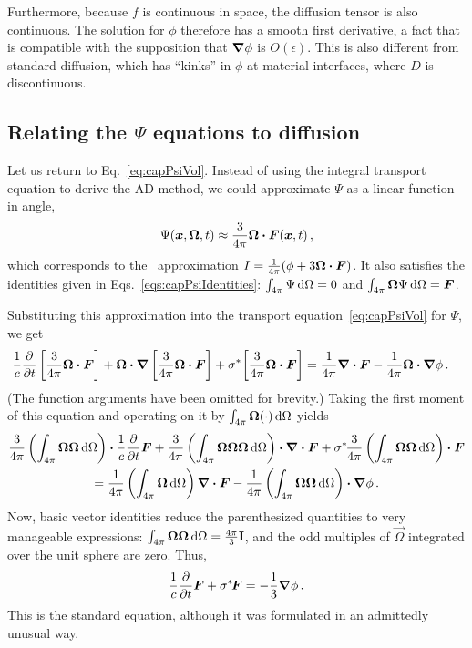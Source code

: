 Furthermore, because $f$ is continuous in space, the diffusion tensor is also
continuous. The solution for $\phi$ therefore has a smooth first
derivative, a fact that is compatible with the supposition that $\bm{\nabla} \phi$
is $O(\epsilon)$. This is also different from standard diffusion, which has
``kinks'' in $\phi$ at material interfaces, where $D$ is discontinuous.

\subsection{Relating the \texorpdfstring{$\Psi$}{Psi} equations to
diffusion}\label{sec:adDiscDiff}
Let us return to Eq.~\eqref{eq:capPsiVol}. Instead of using the integral
transport equation to derive the AD method, we could approximate $\Psi$
as a linear function in angle,
\begin{equation*}
  \Psi(\bm{x}, \bm{\Omega}, t) \approx \frac{3}{4\pi} \bm{\Omega} \bm{\cdot}
  \bm{F}(\bm{x}, t)\,,
\end{equation*}
which corresponds to the \Pone\ approximation $I= \frac{1}{4\pi} (\phi +
3\bm{\Omega} \bm{\cdot} \bm{F})$. It also satisfies the identities given in
Eqs.~\eqref{eqs:capPsiIdentities}: $\int_{4\pi} \Psi \mathop{}\!\mathrm{d}\Omega = 0$ and
$\int_{4\pi} \bm{\Omega} \Psi \mathop{}\!\mathrm{d}\Omega = \bm{F}$.

Substituting this approximation into the transport equation~\eqref{eq:capPsiVol}
for $\Psi$, we get
\begin{align*}
  \frac{1}{c} \frac{\partial }{\partial t} \left[ \frac{3}{4\pi} \bm{\Omega} \bm{\cdot} \bm{F} \right]
  + \bm{\Omega}\bm{\cdot} \bm{\nabla} \left[ \frac{3}{4\pi} \bm{\Omega} \bm{\cdot} \bm{F} \right]
  + \sigma^{*\!} \left[ \frac{3}{4\pi} \bm{\Omega} \bm{\cdot} \bm{F} \right]
  &= \frac{1}{4\pi} \bm{\nabla} \bm{\cdot}\bm{F}
  - \frac{1}{4\pi} \bm{\Omega}\bm{\cdot} \bm{\nabla} \phi\,.
\end{align*}
(The function arguments have been omitted for brevity.)
Taking the first moment of this equation and operating on it by $\int_{4\pi}
\bm{\Omega}(\cdot) \mathop{}\!\mathrm{d}\Omega$ yields
\begin{multline*}
\frac{3}{4\pi} \left( \int_{4\pi} \bm{\Omega}\bm{\Omega}\mathop{}\!\mathrm{d}\Omega \right) \bm{\cdot}
\frac{1}{c} \frac{\partial }{\partial t} \bm{F}
+ \frac{3}{4\pi} \left( \int_{4\pi}
  \bm{\Omega}\bm{\Omega}\bm{\Omega}\mathop{}\!\mathrm{d}\Omega \right)
\bm{\cdot} \bm{\nabla} \bm{\cdot} \bm{F}
+ \sigma^{*\!} \frac{3}{4\pi} \left( \int_{4\pi}
\bm{\Omega}\bm{\Omega}\mathop{}\!\mathrm{d}\Omega \right) \bm{\cdot}\bm{F}
\\
= \frac{1}{4\pi} \left( \int_{4\pi} \bm{\Omega}\mathop{}\!\mathrm{d}\Omega \right)
\bm{\nabla} \bm{\cdot}\bm{F}
- \frac{1}{4\pi} \left( \int_{4\pi} \bm{\Omega}\bm{\Omega}\mathop{}\!\mathrm{d}\Omega \right)
\bm{\cdot} \bm{\nabla} \phi\,.
\end{multline*}
Now, basic vector identities \cite{Lar2007} reduce the parenthesized
quantities to very manageable expressions: $\int_{4\pi}
\bm{\Omega}\bm{\Omega}\mathop{}\!\mathrm{d}\Omega=\frac{4\pi}{3}\mathbf{I}$, and the odd
multiples of $\vec{\Omega}$ integrated over the unit sphere are zero. Thus,
\begin{equation*}
  \frac{1}{c} \frac{\partial }{\partial t} \bm{F}
  + \sigma^{*\!} \bm{F}
  =
  - \frac{1}{3} \bm{\nabla} \phi\,.
\end{equation*}
This is the standard \Pone{} equation, although it was formulated in an
admittedly unusual way.

